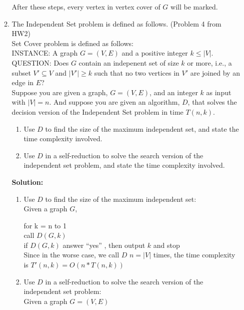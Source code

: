 \documentclass{article}%
\begin{document}
\begin{enumerate}
\begin{enumerate}
  After these steps, every vertex in vertex cover of $G$ will be marked.

	 \item The Independent Set problem is defined as follows. (Problem 4 from HW2)\\
  Set Cover problem is defined as follows:\\
  INSTANCE: A graph $G=(V,E)$ and a positive integer $k \leq |V|$.\\
  QUESTION: Does $G$ contain an indepenent set of size $k$ or more, i.e., a subset $V' \subseteq V$ and  $|V'| \geq k$ such that no two vertices in $V'$ are joined by an edge in $E$?\\
  Suppose you are given a graph, $G=(V,E)$, and an integer $k$ as input with $|V|=n$. And suppose you are given an algorithm, $D$, that solves the decision version of the Independent Set problem in time $T(n,k)$.
  	\begin {enumerate}
	\item Use $D$ to find the size of the maximum independent set, and state the time complexity involved.
	\item Use $D$ in a self-reduction to solve the search version of the independent set problem, and state the time complexity involved.  
	\end{enumerate}

\textbf{Solution:}

\begin{enumerate}
	\item Use $D$ to find the size of the maximum independent set:\\
	Given a graph $G$,
	
	for k = n to 1\\
	\hspace*{0.2in} call $D(G,k)$\\
	\hspace*{0.2in} if $D(G,k)$ answer ``yes'' , then output $k$ and stop \\
	
	Since in the worse case, we call $D$ $n=|V|$ times, the time complexity is $T'(n,k)=O(n*T(n,k))$
	
	\item Use $D$ in a self-reduction to solve the search version of the independent set problem:\\
	Given a graph $G=(V,E)$\\
	

\end{enumerate}
\end{enumerate}
\end{enumerate}
\end{document}
